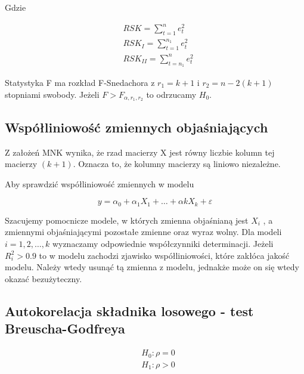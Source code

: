 Gdzie

\begin{equation}
    \begin{split}
        &RSK = \sum_{t=1}^{n} e_{t}^{2} \\
        &RSK_{I} = \sum_{t=1}^{n_1} e_{t}^{2} \\
        &RSK_{II} = \sum_{t=n_1}^{n} e_{t}^{2}
    \end{split}
\end{equation}

Statystyka F ma rozkład F-Snedachora z \(r_1=k+1 \) i \(r_2= n -2(k+1) \) stopniami swobody.
Jeżeli \( F > F_{\alpha,r_1,r_2} \) to odrzucamy \(H_{0}\).

\subsection{Współliniowość zmiennych objaśniających}\label{subsec:współliniowość-zmiennych-objaśniających}

Z założeń MNK wynika, że rzad macierzy X jest równy liczbie kolumn tej macierzy \((k+1)\).
Oznacza to, że kolumny macierzy są liniowo niezależne.

Aby sprawdzić współliniowość zmiennych w modelu

\begin{equation}
    y = \alpha_{0} + \alpha_{1}X_{1} + \dots + \alpha{k}X_{k} + \varepsilon
\end{equation}

Szacujemy pomocnicze modele, w których zmienna objaśnianą jest \(X_i\) , a zmiennymi objaśniającymi pozostałe zmienne oraz wyraz wolny.
Dla modeli \(i=1,2, \dots ,k \) wyznaczamy odpowiednie współczynniki determinacji.
Jeżeli \(R_{i}^{2} > 0.9\) to w modelu zachodzi zjawisko współliniowości, które zakłóca jakość modelu.
Należy wtedy usunąć tą zmienna z modelu, jednakże może on się wtedy okazać bezużyteczny.

\subsection{Autokorelacja składnika losowego - test Breuscha-Godfreya}\label{subsec:autokorelacja-składnika-losowego}

\begin{equation}
    \begin{split}
        &H_0: \rho = 0 \\
        &H_1: \rho > 0
    \end{split}
\end{equation}

